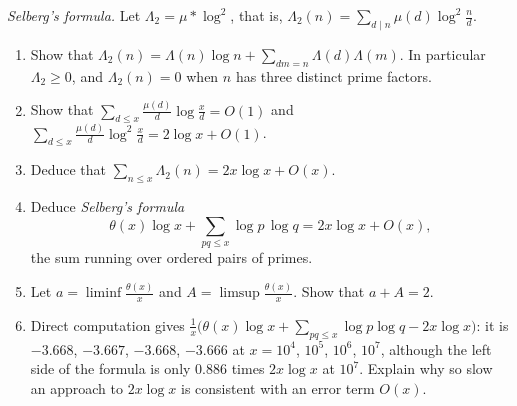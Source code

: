 \begin{exercise}[Journey]\label{pb:selberg}
\emph{Selberg's formula.} Let $\Lambda_2=\mu*\log^2$, that is, $\Lambda_2(n)=\sum_{d\mid n}\mu(d)\log^2\frac nd$.
\begin{enumerate}[label=(\alph*)]
\item Show that $\Lambda_2(n)=\Lambda(n)\log n+\sum_{dm=n}\Lambda(d)\Lambda(m)$. In particular $\Lambda_2\ge0$, and $\Lambda_2(n)=0$ when $n$ has three distinct prime
factors.
\item Show that $\sum_{d\le x}\frac{\mu(d)}d\log\frac xd=O(1)$ and $\sum_{d\le x}\frac{\mu(d)}d\log^2\frac xd=2\log x+O(1)$.
\item Deduce that $\sum_{n\le x}\Lambda_2(n)=2x\log x+O(x)$.
\item Deduce \emph{Selberg's formula}
\[
\theta(x)\log x+\sum_{pq\le x}\log p\,\log q=2x\log x+O(x),
\]
the sum running over ordered pairs of primes.
\item Let $a=\liminf\frac{\theta(x)}x$ and $A=\limsup\frac{\theta(x)}x$. Show that $a+A=2$.
\item Direct computation gives $\frac1x\bigl(\theta(x)\log x+\sum_{pq\le x}\log p\log q-2x\log x\bigr)$: it is $-3.668$, $-3.667$, $-3.668$, $-3.666$ at $x=10^4$, $10^5$,
$10^6$, $10^7$, although the left side of the formula is only $0.886$ times $2x\log x$ at $10^7$. Explain why so slow an approach to $2x\log x$ is consistent with an
error term $O(x)$.
\end{enumerate}
\end{exercise}

